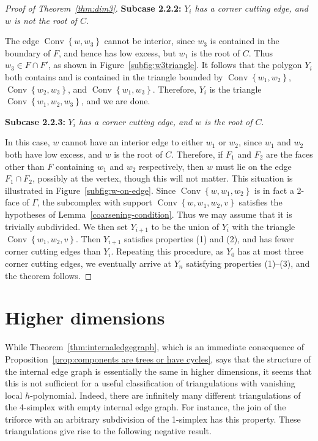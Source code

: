 \documentclass[10pt]{amsart}
\DeclareMathOperator{\Convop}{Conv}
\newcommand{\Conv}[1]{\Convop\left\{{#1}\right\}}
\newenvironment{proofsection}[2]{\par\smallskip\noindent\textbf{#1} \emph{#2}.\par\nobreak}{\par\smallskip}
\begin{document}
\begin{proof}[Proof of Theorem~\ref{thm:dim3}]
\begin{proofsection}{Subcase 2.2.2:}{$Y_i$ has a corner cutting edge, and $w$ is not the root of $C$}
The edge $\Conv{w,w_3}$ cannot be interior, since $w_3$ is contained in the boundary of $F$, and hence has low excess, but $w_1$ is the root of $C$. Thus $w_3 \in F\cap F'$, as shown in Figure~\ref{subfig:w3triangle}. It follows that the polygon $Y_i$ both contains and is contained in the triangle bounded by $\Conv{w_1, w_2}$, $\Conv{w_2, w_3}$, and $\Conv{w_1, w_3}$. Therefore, $Y_i$ is the triangle $\Conv{w_1, w_2, w_3}$, and we are done.
\end{proofsection}

\begin{proofsection}{Subcase 2.2.3:}{$Y_i$ has a corner cutting edge, and $w$ is the root of $C$}

In this case, $w$ cannot have an interior edge to either $w_1$ or $w_2$, since $w_1$ and $w_2$ both have low excess, and $w$ is the root of $C$. Therefore, if $F_1$ and $F_2$ are the faces other than $F$ containing $w_1$ and $w_2$ respectively, then $w$ must lie on the edge $F_1\cap F_2$, possibly at the vertex, though this will not matter. This situation is illustrated in Figure~\ref{subfig:w-on-edge}. Since $\Conv{w,w_1,w_2}$ is in fact a 2-face of $\Gamma$, the subcomplex with support $\Conv{w,w_1,w_2,v}$ satisfies the hypotheses of Lemma~\ref{coarsening-condition}. Thus we may assume that it is trivially subdivided. We then set $Y_{i+1}$ to be the union of $Y_i$ with the triangle $\Conv{w_1, w_2, v}$. Then $Y_{i+1}$ satisfies properties (1) and (2), and has fewer corner cutting edges than $Y_i$. Repeating this procedure, as $Y_0$ has at most three corner cutting edges, we eventually arrive at $Y_n$ satisfying properties (1)--(3), and the theorem follows.\qedhere
\end{proofsection}
\end{proof}

\section{Higher dimensions} \label{sec:higherdim}

While Theorem~\ref{thm:internaledgegraph}, which is an immediate consequence of Proposition~\ref{prop:components are trees or have cycles}, says that the structure of the internal edge graph is essentially the same in higher dimensions, it seems that this is not sufficient for a useful classification of triangulations with vanishing local $h$-polynomial. Indeed, there are infinitely many different triangulations of the 4-simplex with empty internal edge graph. For instance, the join of the triforce with an arbitrary subdivision of the 1-simplex has this property. These triangulations give rise to the following negative result.
\end{document}
